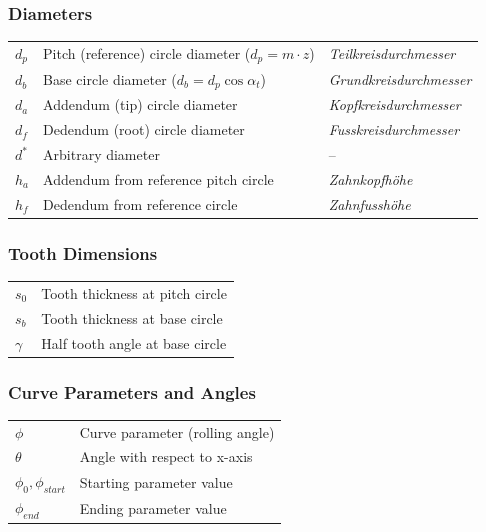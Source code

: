\subsubsection*{Diameters}
\begin{tabular}{@{}lll@{}}
    $d_p$   & Pitch (reference) circle diameter ($d_p = m \cdot z$)
            & \textit{Teilkreisdurchmesser} \\
    $d_b$   & Base circle diameter ($d_b = d_p \cos\alpha_t$)
            & \textit{Grundkreisdurchmesser} \\
    $d_a$   & Addendum (tip) circle diameter
            & \textit{Kopfkreisdurchmesser} \\
    $d_f$   & Dedendum (root) circle diameter
            & \textit{Fusskreisdurchmesser} \\
    $d^*$   & Arbitrary diameter
            & -- \\
    $h_a$   & Addendum from reference pitch circle
            & \textit{Zahnkopfhöhe} \\
    $h_f$   & Dedendum from reference circle
            & \textit{Zahnfusshöhe}
\end{tabular}

\subsubsection*{Tooth Dimensions}
\begin{tabular}{@{}ll@{}}
    $s_0$   & Tooth thickness at pitch circle \\
    $s_b$   & Tooth thickness at base circle \\
    $\gamma$& Half tooth angle at base circle \\
\end{tabular}

\subsubsection*{Curve Parameters and Angles}
\begin{tabular}{@{}ll@{}}
    $\phi$      & Curve parameter (rolling angle) \\
    $\theta$    & Angle with respect to x-axis \\
    $\phi_0, \phi_{start}$    & Starting parameter value \\
    $\phi_{end}$    & Ending parameter value \\
\end{tabular}

